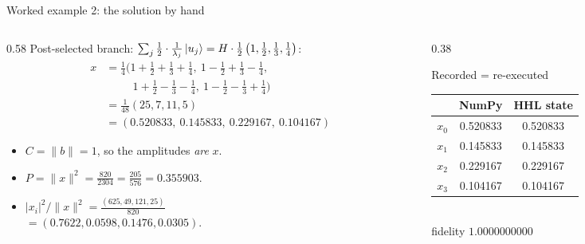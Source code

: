 \documentclass[aspectratio=169,11pt]{beamer}
\begin{document}
\begin{frame}{Worked example 2: the solution by hand}
  \begin{columns}[T]
    \begin{column}{0.58\textwidth}
      \small Post-selected branch: $\sum_j\frac12\cdot\frac1{\lambda_j}\ket{u_j} = H\cdot\frac12\left(1, \tfrac12, \tfrac13, \tfrac14\right)$:
      \begin{align*}
        x &= \tfrac14\big(1 + \tfrac12 + \tfrac13 + \tfrac14,\ 1 - \tfrac12 + \tfrac13 - \tfrac14,\\
          &\qquad\ \ 1 + \tfrac12 - \tfrac13 - \tfrac14,\ 1 - \tfrac12 - \tfrac13 + \tfrac14\big)\\
          &= \tfrac{1}{48}(25, 7, 11, 5)\\
          &= (0.520833,\ 0.145833,\ 0.229167,\ 0.104167)
      \end{align*}
      \begin{itemize}
        \item $C = \|b\| = 1$, so the amplitudes \emph{are} $x$.
        \item $P = \|x\|^2 = \frac{820}{2304} = \frac{205}{576} = 0.355903$.
        \item $|x_i|^2/\|x\|^2 = \frac{(625, 49, 121, 25)}{820}$\\ $= (0.7622, 0.0598, 0.1476, 0.0305)$.
      \end{itemize}
    \end{column}
    \begin{column}{0.38\textwidth}
      \begin{exampleblock}{Recorded = re-executed}
        \footnotesize
        \begin{tabular}{lcc}
          \toprule & NumPy & HHL state\\ \midrule
          $x_0$ & 0.520833 & 0.520833\\ $x_1$ & 0.145833 & 0.145833\\ $x_2$ & 0.229167 & 0.229167\\ $x_3$ & 0.104167 & 0.104167\\ \bottomrule
        \end{tabular}\\[1mm]
        fidelity $1.0000000000$
      \end{exampleblock}
    \end{column}
  \end{columns}
\end{frame}

\end{document}
